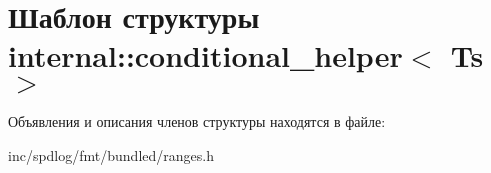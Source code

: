 \hypertarget{structinternal_1_1conditional__helper}{}\section{Шаблон структуры internal\+:\+:conditional\+\_\+helper$<$ Ts $>$}
\label{structinternal_1_1conditional__helper}


Объявления и описания членов структуры находятся в файле\+:\begin{DoxyCompactItemize}
\item 
inc/spdlog/fmt/bundled/ranges.\+h\end{DoxyCompactItemize}
